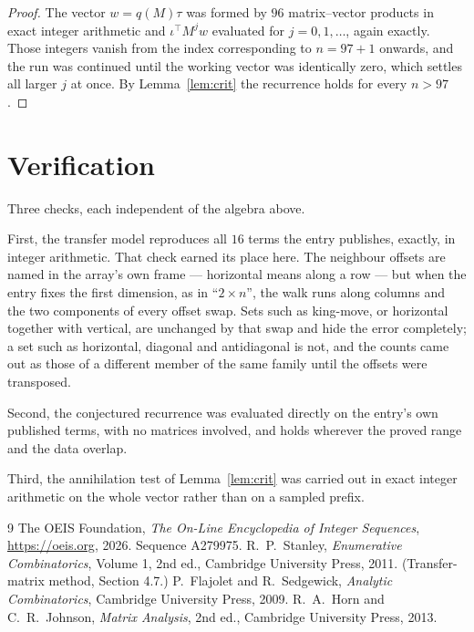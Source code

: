 \documentclass[11pt,a4paper]{article}
\theoremstyle{plain}
\theoremstyle{definition}
\begin{document}
\begin{proof}
The vector $w=q(M)\tau$ was formed by $96$ matrix--vector products in exact integer
arithmetic and $\iota^{\!\top}M^{j}w$ evaluated for $j=0,1,\dots$, again exactly. Those
integers vanish from the index corresponding to $n=97+1$ onwards, and the run was
continued until the working vector was identically zero, which settles all larger $j$ at once.
By Lemma~\ref{lem:crit} the recurrence holds for every $n>97$.
\end{proof}

\section{Verification}

Three checks, each independent of the algebra above.

First, the transfer model reproduces all $16$ terms the entry publishes, exactly, in
integer arithmetic. That check earned its place here. The neighbour offsets are named in the
array's own frame --- horizontal means along a row --- but when the entry fixes the first
dimension, as in ``$2\times n$'', the walk runs along columns and the two components of every
offset swap. Sets such as king-move, or horizontal together with vertical, are unchanged by
that swap and hide the error completely; a set such as horizontal, diagonal and antidiagonal
is not, and the counts came out as those of a different member of the same family until the
offsets were transposed.

Second, the conjectured recurrence was evaluated directly on the entry's own published terms,
with no matrices involved, and holds wherever the proved range and the data overlap.

Third, the annihilation test of Lemma~\ref{lem:crit} was carried out in exact integer
arithmetic on the whole vector rather than on a sampled prefix.

\begin{thebibliography}{9}
 The OEIS Foundation, \emph{The On-Line Encyclopedia of Integer
Sequences}, \url{https://oeis.org}, 2026. Sequence A279975.
 R.~P.~Stanley, \emph{Enumerative Combinatorics}, Volume 1, 2nd ed.,
Cambridge University Press, 2011. (Transfer-matrix method, Section 4.7.)
 P.~Flajolet and R.~Sedgewick, \emph{Analytic Combinatorics}, Cambridge
University Press, 2009.
 R.~A.~Horn and C.~R.~Johnson, \emph{Matrix Analysis}, 2nd ed., Cambridge
University Press, 2013.
\end{thebibliography}
\end{document}
